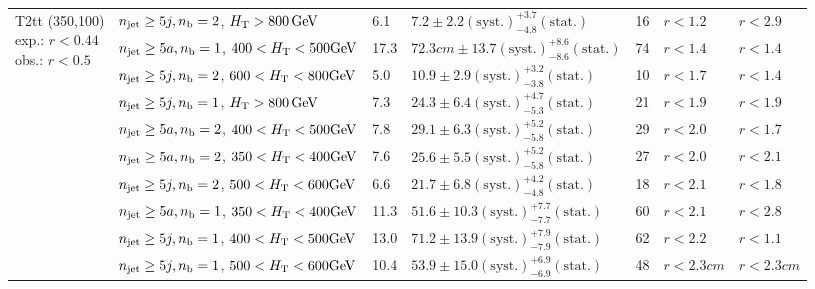 \begin{table}[h!]
\begin{tabular}{ lllllll }
\multirow{10}{*}{\parbox[t]{2.3cm}{T2tt (350,100)\\exp.: $r<0.44$\\obs.: $r<0.5$}}
 & $n_{\mathrm{jet}} \geq5j,n_{\text{b}} =2$, $\mbox{$H_\text{T}$} > 800 \, \mathrm{GeV}$ & 6.1 & $7.2 \pm 2.2 \mathrm{(syst.)} ^{+3.7}_{-4.8} \mathrm{(stat.)}$ & 16 & $r < 1.2$ & $r < 2.9$\\ 
 & $n_{\mathrm{jet}} \geq5a,n_{\text{b}} =1$, $400 < \mbox{$H_\text{T}$} < 500 \mathrm{GeV}$ & 17.3 & $72.3cm \pm 13.7 \mathrm{(syst.)} ^{+8.6}_{-8.6} \mathrm{(stat.)}$ & 74 & $r < 1.4$ & $r < 1.4$\\ 
 & $n_{\mathrm{jet}} \geq5j,n_{\text{b}} =2$, $600 < \mbox{$H_\text{T}$} < 800 \mathrm{GeV}$ & 5.0 & $10.9 \pm 2.9 \mathrm{(syst.)} ^{+3.2}_{-3.8} \mathrm{(stat.)}$ & 10 & $r < 1.7$ & $r < 1.4$\\ 
 & $n_{\mathrm{jet}} \geq5j,n_{\text{b}} =1$, $\mbox{$H_\text{T}$} > 800 \, \mathrm{GeV}$ & 7.3 & $24.3 \pm 6.4 \mathrm{(syst.)} ^{+4.7}_{-5.3} \mathrm{(stat.)}$ & 21 & $r < 1.9$ & $r < 1.9$\\ 
 & $n_{\mathrm{jet}} \geq5a,n_{\text{b}} =2$, $400 < \mbox{$H_\text{T}$} < 500 \mathrm{GeV}$ & 7.8 & $29.1 \pm 6.3 \mathrm{(syst.)} ^{+5.2}_{-5.8} \mathrm{(stat.)}$ & 29 & $r < 2.0$ & $r < 1.7$\\ 
 & $n_{\mathrm{jet}} \geq5a,n_{\text{b}} =2$, $350 < \mbox{$H_\text{T}$} < 400 \mathrm{GeV}$ & 7.6 & $25.6 \pm 5.5 \mathrm{(syst.)} ^{+5.2}_{-5.8} \mathrm{(stat.)}$ & 27 & $r < 2.0$ & $r < 2.1$\\ 
 & $n_{\mathrm{jet}} \geq5j,n_{\text{b}} =2$, $500 < \mbox{$H_\text{T}$} < 600 \mathrm{GeV}$ & 6.6 & $21.7 \pm 6.8 \mathrm{(syst.)} ^{+4.2}_{-4.8} \mathrm{(stat.)}$ & 18 & $r < 2.1$ & $r < 1.8$\\ 
 & $n_{\mathrm{jet}} \geq5a,n_{\text{b}} =1$, $350 < \mbox{$H_\text{T}$} < 400 \mathrm{GeV}$ & 11.3 & $51.6 \pm 10.3 \mathrm{(syst.)} ^{+7.7}_{-7.7} \mathrm{(stat.)}$ & 60 & $r < 2.1$ & $r < 2.8$\\ 
 & $n_{\mathrm{jet}} \geq5j,n_{\text{b}} =1$, $400 < \mbox{$H_\text{T}$} < 500 \mathrm{GeV}$ & 13.0 & $71.2 \pm 13.9 \mathrm{(syst.)} ^{+7.9}_{-7.9} \mathrm{(stat.)}$ & 62 & $r < 2.2$ & $r < 1.1$\\ 
 & $n_{\mathrm{jet}} \geq5j,n_{\text{b}} =1$, $500 < \mbox{$H_\text{T}$} < 600 \mathrm{GeV}$ & 10.4 & $53.9 \pm 15.0 \mathrm{(syst.)} ^{+6.9}_{-6.9} \mathrm{(stat.)}$ & 48 & $r < 2.3cm$ & $r < 2.3cm$\\ \hline
    \hline
  \end{tabular}
\end{table}

